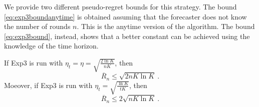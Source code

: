 \documentclass[11pt]{hackednow}
\newcommand{\oR}{\overline{R}}
\begin{document}
We provide two different pseudo-regret bounds for this strategy. The bound \eqref{eq:exp3boundanytime} is obtained assuming that the forecaster does not know the number of rounds $n$. This is the anytime version of the algorithm. The bound \eqref{eq:exp3bound}, instead, shows that a better constant can be achieved using the knowledge of the time horizon.
\begin{theorem} \label{th:Exp3}
If Exp3 is run with $\eta_t=\eta = \sqrt{\frac{2 \ln K}{n K}}$, then
\begin{equation} \label{eq:exp3bound}
\oR_n \leq \sqrt{2 n K \ln K}~.
\end{equation}
Moeover, if Exp3 is run with $\eta_t = \sqrt{\frac{\ln K}{t K}}$, then
\begin{equation} \label{eq:exp3boundanytime}
\oR_n \leq 2 \sqrt{n K \ln K}~.
\end{equation}
\end{theorem}
\end{document}
